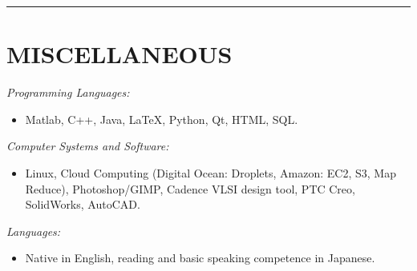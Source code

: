\documentclass[margin]{res}
\begin{document}
\begin{resume}
\rule{\linewidth}{1mm}  %

\section{\MakeUppercase{Miscellaneous}}

\textit{Programming Languages:} 
\begin{itemize}
\item Matlab, C++, Java, LaTeX, Python, Qt, HTML, SQL.
\end{itemize}

\textit{Computer Systems and Software:} 
\begin{itemize}
\item Linux, Cloud Computing (Digital Ocean: Droplets, Amazon: EC2, S3, Map Reduce), Photoshop/GIMP, Cadence VLSI design tool, PTC Creo, SolidWorks, AutoCAD.
\end{itemize}

\textit{Languages:} 
\begin{itemize}
\item Native in English, reading and basic speaking competence in Japanese.
\end{itemize}


\end{resume}
\end{document}
